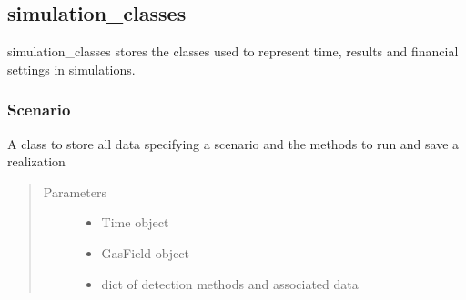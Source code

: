 \documentclass[letterpaper,10pt,english]{sphinxmanual}
\begin{document}
\subsection{simulation\_classes}
\label{\detokenize{index:module-feast.EmissionSimModules.simulation_classes}}\label{\detokenize{index:simulation-classes}}
simulation\_classes stores the classes used to represent time, results and financial settings in simulations.


\subsubsection{Scenario}
\label{\detokenize{index:scenario}}

\begin{fulllineitems}
\label{\detokenize{index:feast.EmissionSimModules.simulation_classes.Scenario}}
A class to store all data specifying a scenario and the methods to run and save a realization
\begin{quote}\begin{description}
\item[{Parameters}] \leavevmode\begin{itemize}
\item {} 
 \textendash{} Time object

\item {} 
 \textendash{} GasField object

\item {} 
 \textendash{} dict of detection methods and associated data

\end{itemize}

\end{description}\end{quote}

\end{fulllineitems}
\end{document}
